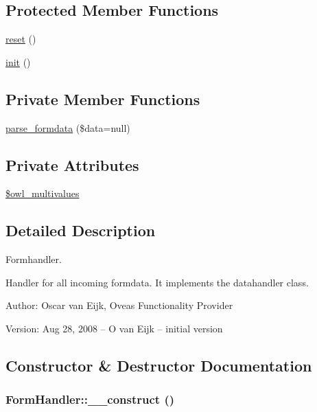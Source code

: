 \subsection*{Protected Member Functions}
\begin{CompactItemize}
\item 
\hyperlink{class__OWL_2f2a042bcf31965194c03033df0edc9b}{reset} ()
\item 
\hyperlink{class__OWL_e0ef3ded56e8a6b34b6461e5a721cd3e}{init} ()
\end{CompactItemize}
\subsection*{Private Member Functions}
\begin{CompactItemize}
\item 
\hyperlink{classFormHandler_ef73c198dbc5de4e84f6c2a23b8b294c}{parse\_\-formdata} (\$data=null)
\end{CompactItemize}
\subsection*{Private Attributes}
\begin{CompactItemize}
\item 
\hyperlink{classFormHandler_7aa914557e2c76b46e4e0601c5dd75d5}{\$owl\_\-multivalues}
\end{CompactItemize}


\subsection{Detailed Description}
Formhandler. 

Handler for all incoming formdata. It implements the datahandler class. \begin{Desc}
\item[Author:]Oscar van Eijk, Oveas Functionality Provider \end{Desc}
\begin{Desc}
\item[Version:]Aug 28, 2008 -- O van Eijk -- initial version \end{Desc}


\subsection{Constructor \& Destructor Documentation}
\hypertarget{classFormHandler_1ef7ad4fe143dd8339c8ab66423a1934}{
\subsubsection{\setlength{\rightskip}{0pt plus 5cm}FormHandler::\_\-\_\-construct ()}}
\label{classFormHandler_1ef7ad4fe143dd8339c8ab66423a1934}


